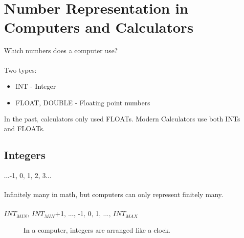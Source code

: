 \documentclass[a4paper,12pt]{report}
\begin{document}
\chapter{Number Representation in Computers and Calculators}

	Which numbers does a computer use?\\
\\
	Two types:

\begin{itemize}
	\item{INT - Integer}
	\item{FLOAT, DOUBLE - Floating point numbers}\\
\end{itemize}

	In the past, calculators only used FLOATs. Modern Calculators use both INTs and FLOATs.


\section{Integers}
	...-1, 0, 1, 2, 3...\\ \\

	Infinitely many in math, but computers can only represent finitely many.\\ \\
	$INT_{MIN}$, $INT_{MIN}$+1, ..., -1, 0, 1, ..., $INT_{MAX}$


\begin{figure}[!htb]

	\caption{In a computer, integers are arranged like a clock.}\label{fig:INT Rollover}
\end{figure}
\end{document}
